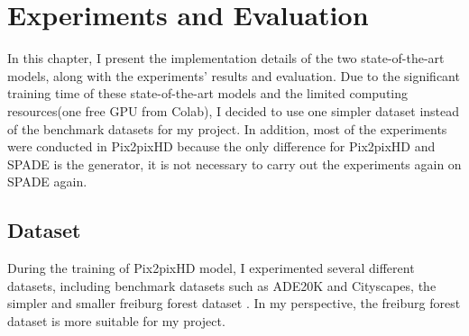 \chapter{Experiments and Evaluation}
In this chapter, I present the implementation details of the two state-of-the-art models, 
along with the experiments' results and evaluation. Due to the significant training time 
of these state-of-the-art models and the limited computing resources(one free GPU from Colab), 
I decided to use one simpler dataset \cite{valada16iser} instead of the benchmark datasets 
for my project. In addition, most of the experiments were conducted in Pix2pixHD because 
the only difference for Pix2pixHD and SPADE is the generator, it is not necessary to carry 
out the experiments again on SPADE again.

\section{Dataset}
During the training of Pix2pixHD model, I experimented several different datasets, including 
benchmark datasets such as ADE20K\cite{zhou2017scene} and Cityscapes\cite{Cordts2016Cityscapes}, 
the simpler and smaller freiburg forest dataset \cite{valada16iser}. In my perspective, the 
freiburg forest dataset \cite{valada16iser} is more suitable for my project.
